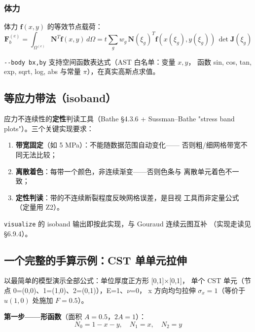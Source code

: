 \documentclass[12pt,a4paper]{ctexart}
\newcommand{\fem}{\Verb}
\begin{document}
\subsubsection{体力}

体力 $\mathbf{f}(x,y)$ 的等效节点载荷：
\begin{equation}
\mathbf{F}_b^{(e)} = \int_{\Omega^{(e)}} \mathbf{N}^T \mathbf{f}(x,y)\,d\Omega
= t \sum_{g} w_g\, \mathbf{N}(\xi_g)^T \mathbf{f}(x(\xi_g), y(\xi_g))\, \det\mathbf{J}(\xi_g)
\end{equation}

\fem|--body bx,by| 支持空间函数表达式（AST 白名单：变量 $x,y$，
函数 sin, cos, tan, exp, sqrt, log, abs 与常量 $\pi$），在真实高斯点求值。

\subsection{等应力带法（isoband）}

应力不连续性的\textbf{定性}判读工具（Bathe §4.3.6 + Sussman--Bathe
"stress band plots"）。三个关键实现要求：

\begin{enumerate}[leftmargin=*]
  \item \textbf{带宽固定}（如 5 MPa）：不能随数据范围自动变化——
        否则粗/细网格带宽不同无法比较；
  \item \textbf{离散着色}：每带一个颜色，非连续渐变——否则色条与
        离散单元着色不一致；
  \item \textbf{定性判读}：带的不连续断裂程度反映网格误差，是目视
        工具而非定量公式（定量用 Z2）。
\end{enumerate}

\fem|visualize| 的 isoband 输出即按此实现，与 Gouraud 连续云图互补
（实现走读见 §6.9.4）。

\subsection{一个完整的手算示例：CST 单单元拉伸}

以最简单的模型演示全部公式：单位厚度正方形 [0,1]$\times$[0,1]，
单个 CST 单元（节点 0=(0,0)、1=(1,0)、2=(0,1)），E=1、$\nu$=0，
x 方向均匀拉伸 $\sigma_x = 1$（等价于 $u(1,0)$ 处施加 $F=0.5$）。

\textbf{第一步——形函数}（面积 $A=0.5$，$2A=1$）：
\begin{equation}
N_0 = 1-x-y, \quad N_1 = x, \quad N_2 = y
\end{equation}
\end{document}
